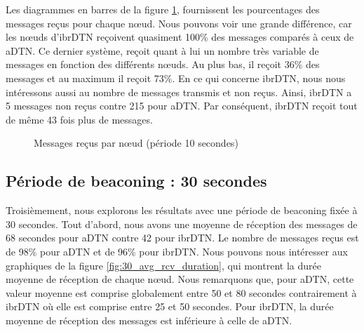 \documentclass[a4paper,10pt]{article}
\begin{document}
Les diagrammes en barres de la figure \ref{fig:10_msg_rcv}, fournissent les pourcentages des messages reçus pour chaque nœud. Nous pouvons voir une grande différence, car les nœuds d’ibrDTN reçoivent quasiment 100\% des messages comparés à ceux de aDTN. Ce dernier système, reçoit quant à lui un nombre très variable de messages en fonction des différents nœuds. Au plus bas, il reçoit 36\% des messages et au maximum il reçoit 73\%. En ce qui concerne ibrDTN, nous nous intéressons aussi au nombre de messages transmis et non reçus. Ainsi, ibrDTN a 5 messages non reçus contre 215 pour aDTN. Par conséquent, ibrDTN reçoit tout de même 43 fois plus de messages.\par

\begin{figure}[h!]
    \centering
    \caption{Messages reçus par nœud  (période 10 secondes)}
    \label{fig:10_msg_rcv}
\end{figure}


\subsection {Période de beaconing : 30 secondes}

Troisièmement, nous explorons les résultats avec une période de beaconing fixée à 30 secondes. Tout d’abord, nous avons une moyenne de réception des messages de 68 secondes pour aDTN contre 42 pour ibrDTN. Le nombre de messages reçus est de 98\% pour aDTN et de 96\% pour ibrDTN. Nous pouvons nous intéresser aux graphiques de la figure \ref{fig:30_avg_rcv_duration}, qui montrent la durée moyenne de réception de chaque nœud. Nous remarquons que, pour aDTN, cette valeur moyenne est comprise globalement entre 50 et 80 secondes contrairement à ibrDTN où elle est comprise entre 25 et 50 secondes. Pour ibrDTN, la durée moyenne de réception des messages est inférieure à celle de aDTN.\par
\end{document}
